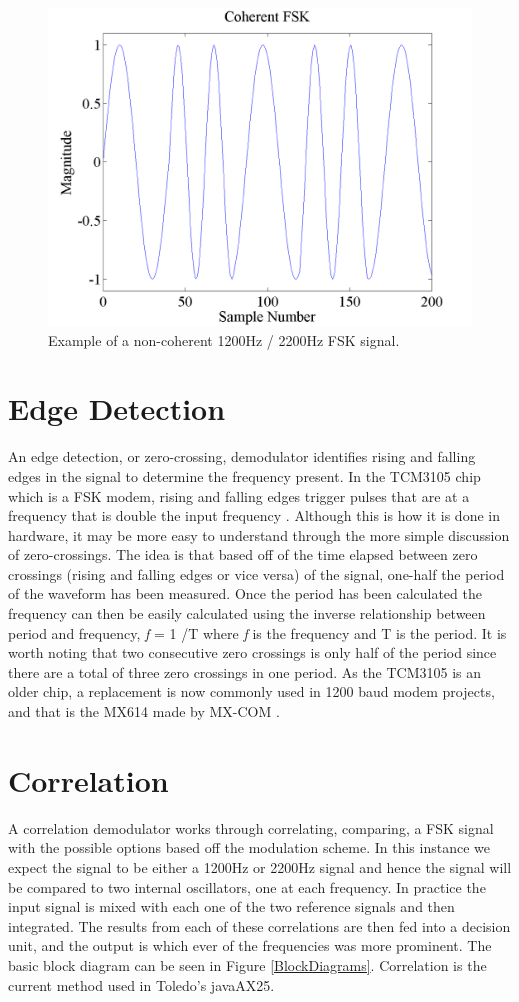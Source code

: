 \begin{figure}
  \centering
	\includegraphics[width=0.75\linewidth]{images/CoherentFSK.png} 
	\caption{Example of a non-coherent 1200Hz / 2200Hz FSK signal.}
   \label{coherentFSKExample}
\end{figure}

\section{Edge Detection}
An edge detection, or zero-crossing, demodulator identifies rising and falling edges in the signal to determine the frequency present. In the TCM3105 chip which is a FSK modem, rising and falling edges trigger pulses that are at a frequency that is double the input frequency \cite{Instruments1994}. Although this is how it is done in hardware, it may be more easy to understand through the more simple discussion of zero-crossings. The idea is that based off of the time elapsed between zero crossings (rising and falling edges or vice versa) of the signal, one-half the period of the waveform has been measured. Once the period has been calculated the frequency can then be easily calculated using the inverse relationship between period and frequency, \textit{f} = 1 /T where \textit{f} is the frequency and T is the period. It is worth noting that two consecutive zero crossings is only half of the period since there are a total of three zero crossings in one period. As the TCM3105 is an older chip, a replacement is now commonly used in 1200 baud modem projects, and that is the MX614 made by MX-COM \cite{Mitrenga2000}.

\section{Correlation}
A correlation demodulator works through correlating, comparing, a FSK signal with the possible options based off the modulation scheme. In this instance we expect the signal to be either a 1200Hz or 2200Hz signal and hence the signal will be compared to two internal oscillators, one at each frequency. In practice the input signal is mixed with each one of the two reference signals and then integrated. The results from each of these correlations are then fed into a decision unit, and the output is which ever of the frequencies was more prominent. The basic block diagram can be seen in Figure \ref{BlockDiagrams}. Correlation is the current method used in Toledo's javaAX25.

